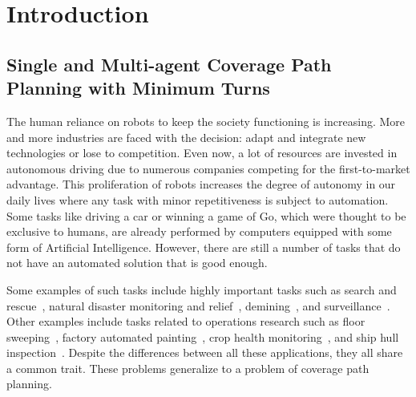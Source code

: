 \documentclass[../main.tex]{subfiles}
\begin{document}
\chapter{Introduction}
\label{chapter:introduction}

\section{Single and Multi-agent Coverage Path Planning with Minimum Turns}
\label{section:coverage_path_planning_with_minimum_turns}

The human reliance on robots to keep the society functioning is increasing. More and more industries are faced with the decision: adapt and integrate new technologies or lose to competition. Even now, a lot of resources are invested in autonomous driving due to numerous companies competing for the first-to-market advantage. This proliferation of robots increases the degree of autonomy in our daily lives where any task with minor repetitiveness is subject to automation. Some tasks like driving a car or winning a game of Go, which were thought to be exclusive to humans, are already performed by computers equipped with some form of Artificial Intelligence. However, there are still a number of tasks that do not have an automated solution that is good enough. 

Some examples of such tasks include highly important tasks such as search and rescue~\cite{ryan2005mode}, natural disaster monitoring and relief~\cite{debusk2010unmanned}, demining~\cite{acar2003path}, and surveillance~\cite{quigley2005target}. Other examples include tasks related to operations research such as floor sweeping~\cite{hofner1994path}, factory automated painting~\cite{sheng2000automated}, crop health monitoring~\cite{rydberg2007field}, and ship hull inspection~\cite{walter2008slam}. Despite the differences between all these applications, they all share a common trait. These problems generalize to a problem of coverage path planning.
\end{document}
